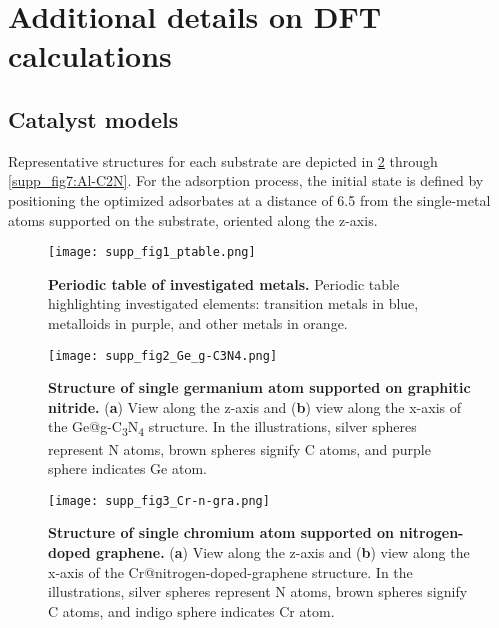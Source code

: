 
\section{Additional details on DFT calculations}

\subsection{Catalyst models}
\label{supp_sec2.1_catalysts}

Representative structures for each substrate are depicted in \cref{supp_fig2:Ge_g-C3N4} through \cref{supp_fig7:Al-C2N}. For the adsorption process, the initial state is defined by positioning the optimized adsorbates at a distance of 6.5 \text{\AA} from the single-metal atoms supported on the substrate, oriented along the z-axis.

\begin{figure}[htbp]
  \centering
  \texttt{[image: supp\_fig1\_ptable.png]}
  \caption{\textbf{Periodic table of investigated metals.}
  Periodic table highlighting investigated elements: transition metals in blue, metalloids in purple, and other metals in orange.}
  \label{supp_fig1:ptable}
\end{figure}

\begin{figure}[htbp]
  \centering
  \texttt{[image: supp\_fig2\_Ge\_g-C3N4.png]}
  \caption{\textbf{Structure of single germanium atom supported on graphitic nitride.}
  (\textbf{a}) View along the z-axis and (\textbf{b}) view along the x-axis
  of the Ge@g-C\textsubscript{3}N\textsubscript{4} structure.
  In the illustrations, silver spheres represent N atoms, brown spheres
  signify C atoms, and purple sphere indicates Ge atom.}
  \label{supp_fig2:Ge_g-C3N4}
\end{figure}

\begin{figure}[htbp]
  \centering
  \texttt{[image: supp\_fig3\_Cr-n-gra.png]}
  \caption{\textbf{Structure of single chromium atom supported on nitrogen-doped graphene.}
  (\textbf{a}) View along the z-axis and (\textbf{b}) view along the x-axis
  of the Cr@nitrogen-doped-graphene structure.
  In the illustrations, silver spheres represent N atoms, brown spheres
  signify C atoms, and indigo sphere indicates Cr atom.}
  \label{supp_fig3:Cr-n-gra}
\end{figure}

